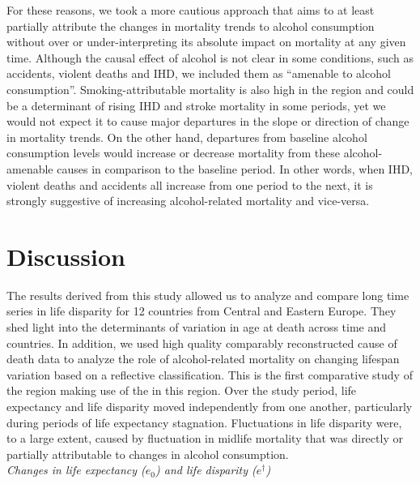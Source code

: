 \documentclass{article}
\begin{document}
\begin{spacing}{1.5}
For these reasons, we took a more cautious approach that aims to at least partially attribute the changes in mortality trends to alcohol consumption without over or under-interpreting its absolute impact on mortality at any given time. Although the causal effect of alcohol is not clear in some conditions, such as accidents, violent deaths and IHD, we included them as ``amenable to alcohol consumption''. Smoking-attributable mortality is also high in the region \citep{ezzati2003estimates} and could be a determinant of rising IHD and stroke mortality in some periods, yet we would not expect it to cause major departures in the slope or direction of change in mortality trends.  On the other hand, departures from baseline alcohol consumption levels would increase or decrease mortality from these alcohol-amenable causes in comparison to the baseline period. In other words, when IHD, violent deaths and accidents all increase from one period to the next, it is strongly suggestive of increasing alcohol-related mortality and vice-versa. 


\section*{Discussion}
The results derived from this study allowed us to analyze and compare long time series in life disparity for 12 countries from Central and Eastern Europe. They shed light into the determinants of variation in age at death across time and countries. In addition, we used high quality comparably reconstructed cause of death data to analyze the role of alcohol-related mortality on changing lifespan variation based on a reflective classification. This is the first comparative study of the region making use of the \citet{HcO} in this region. Over the study period, life expectancy and life disparity moved independently from one another, particularly during periods of life expectancy stagnation. Fluctuations in life disparity were, to a large extent, caused by fluctuation in midlife mortality that was directly or partially attributable to changes in alcohol consumption. \\
 
\emph{Changes in life expectancy ($e_0$) and life disparity ($e^\dagger$)}\\


\end{spacing}
\end{document}
